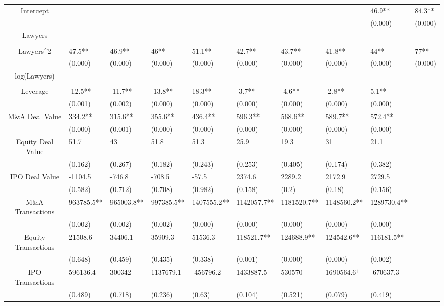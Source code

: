 \documentclass{article}
\begin{document}
\begin{table}[H]
\begin{tabular}{|clllllllll|}
Intercept &  &  &  &  &  &  &  & 46.9** & 84.3** \\ 
   &  &  &  &  &  &  &  & (0.000) & (0.000) \\ 
  Lawyers &  &  &  &  &  &  &  &  &  \\ 
   &  &  &  &  &  &  &  &  &  \\ 
  Lawyers^2 & 47.5** & 46.9** & 46** & 51.1** & 42.7** & 43.7** & 41.8** & 44** & 77** \\ 
   & (0.000) & (0.000) & (0.000) & (0.000) & (0.000) & (0.000) & (0.000) & (0.000) & (0.000) \\ 
  log(Lawyers) &  &  &  &  &  &  &  &  &  \\ 
   &  &  &  &  &  &  &  &  &  \\ 
  Leverage & -12.5** & -11.7** & -13.8** & 18.3** & -3.7** & -4.6** & -2.8** & 5.1** &  \\ 
   & (0.001) & (0.002) & (0.000) & (0.000) & (0.000) & (0.000) & (0.000) & (0.000) &  \\ 
  M\&A Deal Value & 334.2** & 315.6** & 355.6** & 436.4** & 596.3** & 568.6** & 589.7** & 572.4** &  \\ 
   & (0.000) & (0.001) & (0.000) & (0.000) & (0.000) & (0.000) & (0.000) & (0.000) &  \\ 
  Equity Deal Value & 51.7 & 43 & 51.8 & 51.3 & 25.9 & 19.3 & 31 & 21.1 &  \\ 
   & (0.162) & (0.267) & (0.182) & (0.243) & (0.253) & (0.405) & (0.174) & (0.382) &  \\ 
  IPO Deal Value & -1104.5 & -746.8 & -708.5 & -57.5 & 2374.6 & 2289.2 & 2172.9 & 2729.5 &  \\ 
   & (0.582) & (0.712) & (0.708) & (0.982) & (0.158) & (0.2) & (0.18) & (0.156) &  \\ 
  M\&A Transactions & 963785.5** & 965003.8** & 997385.5** & 1407555.2** & 1142057.7** & 1181520.7** & 1148560.2** & 1289730.4** &  \\ 
   & (0.002) & (0.002) & (0.002) & (0.000) & (0.000) & (0.000) & (0.000) & (0.000) &  \\ 
  Equity Transactions & 21508.6 & 34406.1 & 35909.3 & 51536.3 & 118521.7** & 124688.9** & 124542.6** & 116181.5** &  \\ 
   & (0.648) & (0.459) & (0.435) & (0.338) & (0.001) & (0.000) & (0.000) & (0.002) &  \\ 
  IPO Transactions & 596136.4 & 300342 & 1137679.1 & -456796.2 & 1433887.5 & 530570 & 1690564.6$^{+}$ & -670637.3 &  \\ 
   & (0.489) & (0.718) & (0.236) & (0.63) & (0.104) & (0.521) & (0.079) & (0.419) &  \\ 

\end{tabular}
\end{table}
\end{document}
